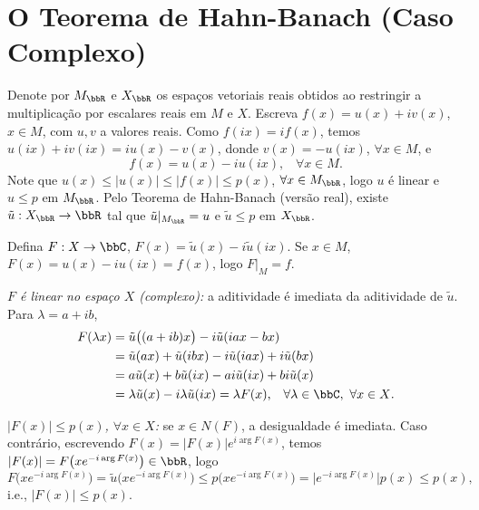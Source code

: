 
\section{O Teorema de Hahn-Banach (Caso Complexo)}

\begin{myproof}
	Denote por $M_{\bbR}$ e $X_{\bbR}$ os espaços vetoriais reais obtidos ao restringir a multiplicação
	por escalares reais em $M$ e $X$. Escreva $f(x)=u(x)+iv(x)$, $x\in M$, com $u,v$ a valores reais.
	Como $f(ix)=if(x)$, temos $u(ix)+iv(ix)=iu(x)-v(x)$, donde $v(x)=-u(ix)$, $\forall x\in M$, e
	$$f(x)=u(x)-iu(ix)\text{,}\quad\forall x\in M\text{.}$$
	Note que $u(x)\leq|u(x)|\leq|f(x)|\leq p(x)$, $\forall x\in M_{\bbR}$, logo $u$ é linear e $u\leq p$
	em $M_{\bbR}$. Pelo Teorema de Hahn-Banach (versão real), existe $\tilde u:X_{\bbR}\to\bbR$ tal que
	$\tilde u|_{M_{\bbR}}=u$ e $\tilde u\leq p$ em $X_{\bbR}$.

	Defina $F:X\to\bbC$, $F(x)=\tilde u(x)-i\tilde u(ix)$. Se $x\in M$, $F(x)=u(x)-iu(ix)=f(x)$, logo
	$F|_M=f$.

	\textit{$F$ é linear no espaço $X$ (complexo):} a aditividade é imediata da aditividade de $\tilde
	u$. Para $\lambda=a+ib$,
	\begin{align*}
		F(\lambda x) & = \tilde u\big((a+ib)x\big)-i\tilde u(iax-bx)                                  \\
		              & = \tilde u(ax)+\tilde u(ibx)-i\tilde u(iax)+i\tilde u(bx)                       \\
		              & = a\tilde u(x)+b\tilde u(ix)-ai\tilde u(ix)+bi\tilde u(x)                       \\
		              & = \lambda\tilde u(x)-i\lambda\tilde u(ix) = \lambda F(x)\text{,}\quad
		\forall\lambda\in\bbC,\ \forall x\in X\text{.}
	\end{align*}

	\textit{$|F(x)|\leq p(x)$, $\forall x\in X$:} se $x\in N(F)$, a desigualdade é imediata. Caso
	contrário, escrevendo $F(x)=|F(x)|e^{i\arg F(x)}$, temos $|F(x)|=F\big(xe^{-i\arg F(x)}\big)\in\bbR$,
	logo
	$$F\big(xe^{-i\arg F(x)}\big)=\tilde u\big(xe^{-i\arg F(x)}\big)\leq p\big(xe^{-i\arg F(x)}\big)=
	\big|e^{-i\arg F(x)}\big|p(x)\leq p(x)\text{,}$$
	i.e., $|F(x)|\leq p(x)$.
\end{myproof}

